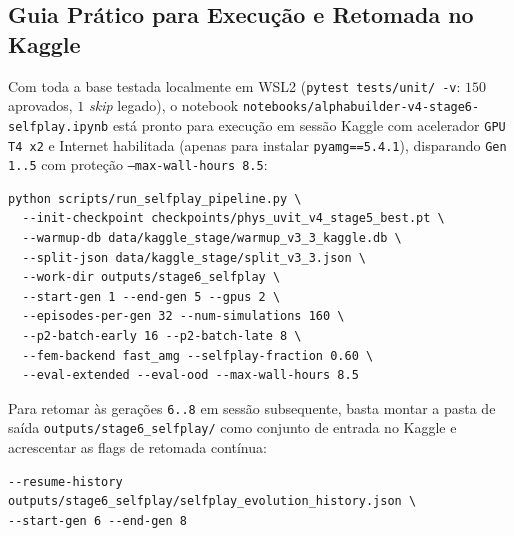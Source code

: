 \documentclass[11pt,a4paper]{article}
\begin{document}
\subsection{Guia Prático para Execução e Retomada no Kaggle}

Com toda a base testada localmente em WSL2 (\texttt{pytest tests/unit/ -v}: $150$ aprovados, $1$ \emph{skip} legado), o notebook \texttt{notebooks/alphabuilder-v4-stage6-selfplay.ipynb} está pronto para execução em sessão Kaggle com acelerador \texttt{GPU T4 x2} e Internet habilitada (apenas para instalar \texttt{pyamg==5.4.1}), disparando \texttt{Gen 1..5} com proteção \texttt{--max-wall-hours 8.5}:
\begin{small}
\begin{verbatim}
python scripts/run_selfplay_pipeline.py \
  --init-checkpoint checkpoints/phys_uvit_v4_stage5_best.pt \
  --warmup-db data/kaggle_stage/warmup_v3_3_kaggle.db \
  --split-json data/kaggle_stage/split_v3_3.json \
  --work-dir outputs/stage6_selfplay \
  --start-gen 1 --end-gen 5 --gpus 2 \
  --episodes-per-gen 32 --num-simulations 160 \
  --p2-batch-early 16 --p2-batch-late 8 \
  --fem-backend fast_amg --selfplay-fraction 0.60 \
  --eval-extended --eval-ood --max-wall-hours 8.5
\end{verbatim}
\end{small}
Para retomar às gerações \texttt{6..8} em sessão subsequente, basta montar a pasta de saída \texttt{outputs/stage6\_selfplay/} como conjunto de entrada no Kaggle e acrescentar as flags de retomada contínua:
\begin{small}
\begin{verbatim}
--resume-history outputs/stage6_selfplay/selfplay_evolution_history.json \
--start-gen 6 --end-gen 8
\end{verbatim}
\end{small}



\end{document}
